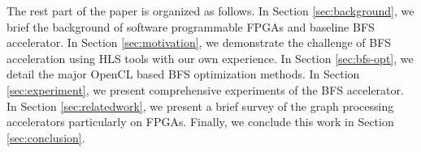 The rest part of the paper is organized as follows. In Section \ref{sec:background}, 
we brief the background of software programmable FPGAs and baseline BFS accelerator. 
In Section \ref{sec:motivation},  
we demonstrate the challenge of BFS acceleration using HLS tools with our own experience.
In Section \ref{sec:bfs-opt}, we detail the major OpenCL based BFS optimization methods.
In Section \ref{sec:experiment}, we present comprehensive experiments of the 
BFS accelerator. In Section \ref{sec:relatedwork}, we present a brief survey of 
the graph processing accelerators particularly on FPGAs. Finally, we conclude 
this work in Section \ref{sec:conclusion}.


